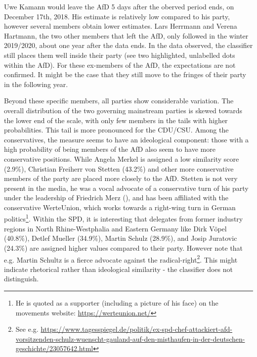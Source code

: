 \documentclass{article}
\begin{document}
Uwe Kamann would leave the AfD 5 days after the oberved period ends, on December 17th, 2018. His estimate is relatively low compared to his party, however several members obtain lower estimates. Lars Herrmann and Verena Hartmann, the two other members that left the AfD, only followed in the winter 2019/2020, about one year after the data ends. In the data observed, the classifier still places them well inside their party (see two highlighted, unlabelled dots within the AfD). For these ex-members of the AfD, the expectations are not confirmed. It might be the case that they still move to the fringes of their party in the following year.\par

Beyond these specific members, all parties show considerable variation. The overall distribution of the two governing mainstream parties is skewed towards the lower end of the scale, with only few members in the tails with higher probabilities. This tail is more pronounced for the CDU/CSU. Among the conservatives, the measure seems to have an ideological component: those with a high probability of being members of the AfD also seem to have more conservative positions. While Angela Merkel is assigned a low similarity score (2.9\%), Christian Freiherr von Stetten (43.2\%) and other more conservative members of the party are placed more closely to the AfD. Stetten is not very present in the media, he was a vocal advocate of a conservative turn of his party under the leadership of Friedrich Merz (\cite{Weinzierler2019}), and has been affiliated with the conservative WerteUnion, which works towards a right-wing turn in German politics\footnote{He is quoted as a supporter (including a picture of his face) on the movements website: \url{https://werteunion.net/}}. Within the SPD, it is interesting that delegates from former industry regions in North Rhine-Westphalia and Eastern Germany like Dirk Vöpel (40.8\%), Detlef Mueller (34.9\%), Martin Schulz (28.9\%), and Josip Juratovic (24.3\%) are assigned higher values compared to their party. However note that e.g. Martin Schultz is a fierce advocate against the radical-right\footnote{See e.g. \href{https://www.tagesspiegel.de/politik/ex-spd-chef-attackiert-afd-vorsitzenden-schulz-wuenscht-gauland-auf-den-misthaufen-in-der-deutschen-geschichte/23057642.html}{https://www.tagesspiegel.de/politik/ex-spd-chef-attackiert-afd-vorsitzenden-schulz-wuenscht-gauland-auf-den-misthaufen-in-der-deutschen-geschichte/23057642.html}}. This might indicate rhetorical rather than ideological similarity - the classifier does not distinguish.\par
\end{document}
